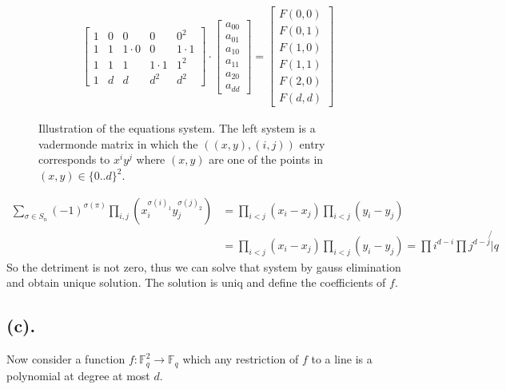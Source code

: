 \documentclass{article}
\newcommand{\FF}{\mathbb{F}}
\begin{document}
\begin{figure}
\begin{equation*}
  \begin{split}
    \begin{bmatrix}
    1 & 0 & 0 &0 &0^{2} \\
    1 & 1 & 1\cdot 0 &0  &1\cdot 1 \\
    1 & 1 & 1 &1 \cdot 1 &1^2 \\ 
    1 & d & d & d^{2} & d^{2}
    \end{bmatrix}
    \cdot 
    \begin{bmatrix}
      a_{00}  \\
      a_{01}  \\
      a_{10}  \\  
      a_{11}  \\
      a_{20}  \\
      a_{dd}  
    \end{bmatrix}
    = 
   \begin{bmatrix}
     F(0,0)  \\
     F(0,1)  \\
     F(1,0)  \\
     F(1,1)  \\
     F(2,0)  \\
     F(d,d)  
    \end{bmatrix}
  \end{split}
\end{equation*}
\caption{ Illustration of the equations system. The left system is a vadermonde matrix in which the $((x,y),(i,j))$ entry corresponds to $x^{i}y^{j}$ where $(x,y)$ are one of the points in $ (x,y)\in \{0..d \}^{2}$.}
\end{figure}

\begin{equation*}
  \begin{split}
    \sum_{\sigma \in S_{n}}{ \left( -1 \right)^{\sigma(\pi)}\prod_{i,j }{( x^{\sigma(i)_{1}}_{i}y^{\sigma(j)_{2}}_{j}  ) } } &= \prod_{i<j}{\left(x_{i} - x_{j}  \right)}\prod_{i<j}\left(y_{i} -y_{j} \right) \\
  &= \prod_{i<j}{\left(x_{i} - x_{j}  \right)}\prod_{i<j}\left(y_{i} -y_{j} \right) = \prod{i^{d-i}}\prod{j^{d-j}} \not{|} q
\end{split}
\end{equation*}
So the detriment is not zero, thus we can solve that system by gauss elimination and obtain unique solution. The solution is uniq and define the coefficients of $f$.  

\subsection{(c).}

Now consider a function $f : \FF_{q}^{2} \rightarrow \FF_{q}$ which any restriction of $f$ to a line is a polynomial at degree at most $d$.   


  \printbibliography 
\end{document}
